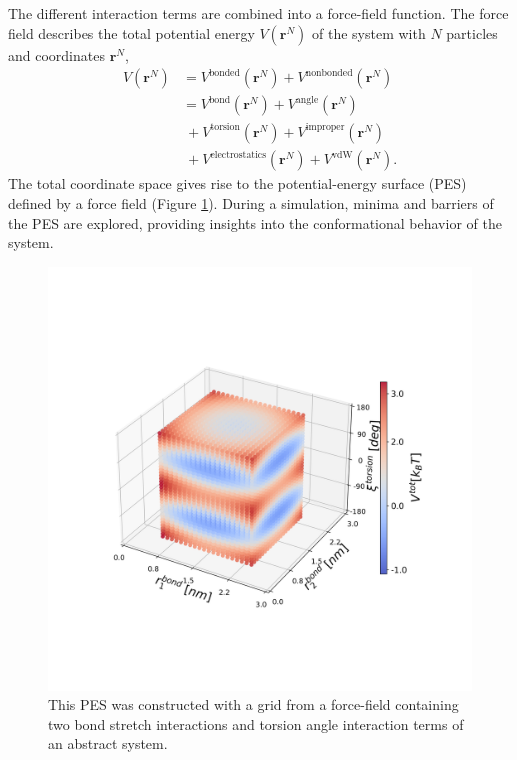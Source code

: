 The different interaction terms are combined into a force-field function. The force field describes the total potential energy $V(\textbf{r}^N)$ of the system with $N$ particles and coordinates $\textbf{r}^N$, \cite{Levitt1969} 
\begin{equation}
\begin{split}
    V(\textbf{r}^N) &= V^\text{bonded}(\textbf{r}^N) + V^\text{nonbonded}(\textbf{r}^N)\\
          &= V^\text{bond}(\textbf{r}^N) + V^\text{angle}(\textbf{r}^N) \\
          &~ + V^\text{torsion}(\textbf{r}^N) + V^\text{improper}(\textbf{r}^N) \\
          &~ + V^\text{electrostatics}(\textbf{r}^N) + V^\text{vdW}(\textbf{r}^N) .
\end{split}
\end{equation}
The total coordinate space gives rise to the potential-energy surface (PES) defined by a force field (Figure \ref{fig:ffPES}).
During a simulation, minima and barriers of the PES are explored, providing insights into the conformational behavior of the system.

\begin{figure}
    \centering
    \includegraphics[width=\textwidth]{2_chapter_intro/fig/ForceField/bondterms.png}
    \caption{This PES was constructed with a grid from a force-field containing two bond stretch interactions and torsion angle interaction terms of an abstract system.}
    \label{fig:ffPES}
\end{figure}

